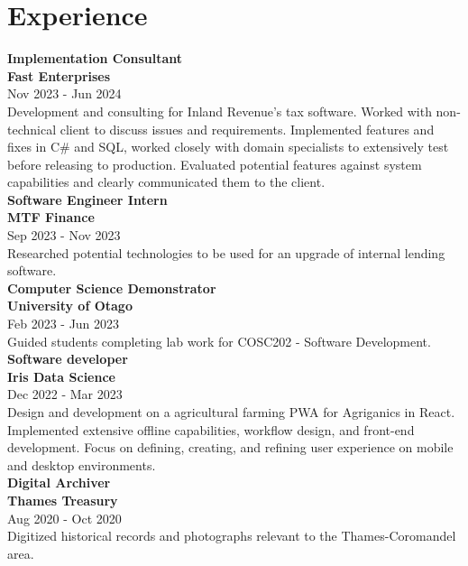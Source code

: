 \documentclass[lighthipster]{simplehipstercv}
\begin{document}
    \begin{minipage}[t]{1\textwidth}
    \section*{Experience}
    
    \textbf{Implementation Consultant}\\
    \textbf{Fast Enterprises }\\
    Nov 2023 - Jun 2024 \\
    Development and consulting for Inland Revenue's tax software. 
        Worked with non-technical client to discuss issues and requirements. 
        Implemented features and fixes in C\# and SQL, worked closely with domain specialists to extensively test before releasing to production.
        Evaluated potential features against system capabilities and clearly communicated them to the client. \\
    
    \textbf{Software Engineer Intern}\\
    \textbf{MTF Finance }\\
    Sep 2023 - Nov 2023 \\
    Researched potential technologies to be used for an upgrade of internal lending software.\\
    
    \textbf{Computer Science Demonstrator}\\
    \textbf{University of Otago }\\
    Feb 2023 - Jun 2023 \\
    Guided students completing lab work for COSC202 - Software Development.\\
    
    \textbf{Software developer}\\
    \textbf{Iris Data Science }\\
    Dec 2022 - Mar 2023 \\
    Design and development on a agricultural farming PWA for Agriganics in React. 
        Implemented extensive offline capabilities, workflow design, and front-end development. 
        Focus on defining, creating, and refining user experience on mobile and desktop environments.\\
    
    \textbf{Digital Archiver}\\
    \textbf{Thames Treasury }\\
    Aug 2020 - Oct 2020 \\
    Digitized historical records and photographs relevant to the Thames-Coromandel area.\\
    

\end{minipage}
\end{document}
